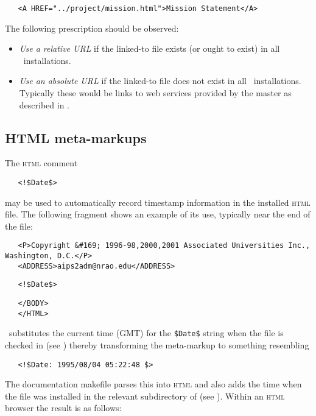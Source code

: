 \begin{verbatim}
   <A HREF="../project/mission.html">Mission Statement</A>
\end{verbatim}

\noindent
The following prescription should be observed:

\begin{itemize}
\item
   {\em Use a relative URL} if the linked-to file exists (or ought to exist)
   in all \aipspp\ installations.

\item
   {\em Use an absolute URL} if the linked-to file does not exist in all
   \aipspp\ installations.  Typically these would be links to web services
   provided by the master as described in .
\end{itemize}

\subsection*{HTML meta-markups}

The \textsc{html} comment

\noindent
\verb+   <!$+\verb+Date$>+

\noindent
may be used to automatically record timestamp information in the installed
\textsc{html} file.  The following fragment shows an example of its use,
typically near the end of the file:

\begin{verbatim}
   <P>Copyright &#169; 1996-98,2000,2001 Associated Universities Inc., Washington, D.C.</P>
   <ADDRESS>aips2adm@nrao.edu</ADDRESS>
\end{verbatim}

\noindent
\verb+   <!$+\verb+Date$>+

\begin{verbatim}
   </BODY>
   </HTML>
\end{verbatim}

\noindent
\rcs\ substitutes the current time (GMT) for the \verb+$+\verb+Date$+ string
when the file is checked in (see ) thereby transforming the
meta-markup to something resembling

\noindent
\verb+   <!$+\verb+Date: 1995/08/04 05:22:48 $>+

\noindent
The documentation makefile parses this into \textsc{html} and also adds the
time when the  file was installed in the relevant subdirectory of
 (see ).  Within an \textsc{html} browser the
result is as follows:

